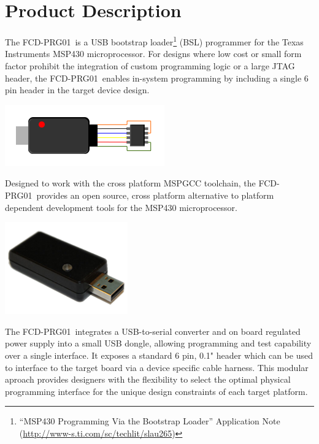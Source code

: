 \documentclass[10pt,letterpaper]{datasheet}
\newcommand{\PID}{FCD-PRG01}
\begin{document}
\section*{Product Description}
\begin{multicols}{2}
  The \PID\ is a USB bootstrap loader\footnote{``MSP430 Programming Via the Bootstrap Loader'' Application Note  (\href{http://www-s.ti.com/sc/techlit/slau265}{http://www-s.ti.com/sc/techlit/slau265})} (BSL) programmer for the Texas Instruments MSP430 microprocessor.  For designs where low cost or small form factor prohibit the integration of custom programming logic or a large JTAG header, the \PID\ enables in-system programming by including a single 6 pin header in the target device design.
  
  \begin{center}
    \includegraphics[width=3 in]{fcd-prg01-diag}
  \end{center}
  
  Designed to work with the cross platform MSPGCC toolchain, the \PID\ provides an open source, cross platform alternative to platform dependent development tools for the MSP430 microprocessor.
  
  \begin{center}
    \includegraphics[width=2 in]{fcd-prg01}
  \end{center}
  
  The \PID\ integrates a USB-to-serial converter and on board regulated power supply into a small USB dongle, allowing programming and test capability over a single interface.  It exposes a standard 6 pin, 0.1" header which can be used to interface to the target board via a device specific cable harness.  This modular aproach provides designers with the flexibility to select the optimal physical programming interface for the unique design constraints of each target platform.  

\end{multicols}
\end{document}
